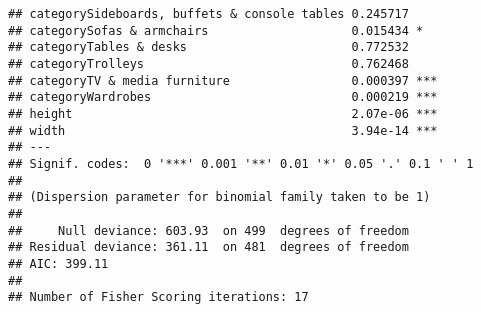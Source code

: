 \documentclass[
]{article}
\begin{document}
\begin{verbatim}
## categorySideboards, buffets & console tables 0.245717    
## categorySofas & armchairs                    0.015434 *  
## categoryTables & desks                       0.772532    
## categoryTrolleys                             0.762468    
## categoryTV & media furniture                 0.000397 ***
## categoryWardrobes                            0.000219 ***
## height                                       2.07e-06 ***
## width                                        3.94e-14 ***
## ---
## Signif. codes:  0 '***' 0.001 '**' 0.01 '*' 0.05 '.' 0.1 ' ' 1
## 
## (Dispersion parameter for binomial family taken to be 1)
## 
##     Null deviance: 603.93  on 499  degrees of freedom
## Residual deviance: 361.11  on 481  degrees of freedom
## AIC: 399.11
## 
## Number of Fisher Scoring iterations: 17
\end{verbatim}
\end{document}
